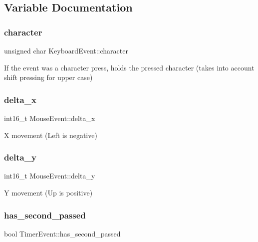 \subsection{Variable Documentation}
\mbox{\label{group__event_gaadaa71d48b0af51dc033410dac4b204e}} 
\subsubsection{\texorpdfstring{character}{character}}
{\footnotesize\ttfamily unsigned char Keyboard\+Event\+::character}



If the event was a character press, holds the pressed character (takes into account shift pressing for upper case) 

\mbox{\label{group__event_ga41f621f2189d0bc748e80c1ddc89d292}} 
\subsubsection{\texorpdfstring{delta\+\_\+x}{delta\_x}}
{\footnotesize\ttfamily int16\+\_\+t Mouse\+Event\+::delta\+\_\+x}



X movement (Left is negative) 

\mbox{\label{group__event_ga3420770b5a1a73976be777d8bd7a3c4c}} 
\subsubsection{\texorpdfstring{delta\+\_\+y}{delta\_y}}
{\footnotesize\ttfamily int16\+\_\+t Mouse\+Event\+::delta\+\_\+y}



Y movement (Up is positive) 

\mbox{\label{group__event_ga5cc6e66bde06d7bbd60a5205f91969ab}} 
\subsubsection{\texorpdfstring{has\+\_\+second\+\_\+passed}{has\_second\_passed}}
{\footnotesize\ttfamily bool Timer\+Event\+::has\+\_\+second\+\_\+passed}



